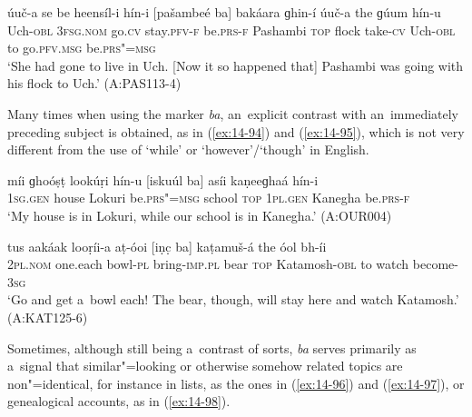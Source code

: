 \begin{exe}
\ex
\label{ex:14-93}
\gll úuč-a se  be heensíl-i  hín-i [pašambeé ba] bakáara ɡhin-í úuč-a the ɡúum hín-u \\
Uch-\textsc{obl} \textsc{3fsg.nom} go.\textsc{cv} stay.\textsc{pfv-f} be.\textsc{prs-f} Pashambi  \textsc{top} flock take-\textsc{cv} Uch-\textsc{obl} to go.\textsc{pfv.msg} be.\textsc{prs"=msg} \\
\glt `She had gone to live in Uch. [Now it so happened that] Pashambi was going with his flock to Uch.' (A:PAS113-4)
\end{exe}

Many times when using the marker \textit{ba}, an~explicit contrast with an~immediately preceding subject is obtained, as in (\ref{ex:14-94}) and (\ref{ex:14-95}), which is not very different from the use of `while' or `however'/`though' in English.

\begin{exe}
\ex
\label{ex:14-94}
\gll míi ɡhoóṣṭ lookúṛi hín-u [iskuúl ba] asíi  kaṇeeɡhaá hín-i \\
\textsc{1sg.gen} house Lokuri be.\textsc{prs"=msg} school \textsc{top} \textsc{1pl.gen} Kanegha be.\textsc{prs-f}\\
\glt `My house is in Lokuri, while our school is in Kanegha.' (A:OUR004)

\ex
\label{ex:14-95}
\gll tus aakáak looṛíi-a aṭ-óoi [iṇc̣ ba]  kaṭamuš-á the óol bh-íi \\
\textsc{2pl.nom} one.each bowl-\textsc{pl} bring-\textsc{imp.pl} bear \textsc{top} Katamosh-\textsc{obl} to watch become-\textsc{3sg } \\
\glt `Go and get a~bowl each! The bear, though, will stay here and watch Katamosh.' (A:KAT125-6)
\end{exe}

Sometimes, although still being a~contrast of sorts, \textit{ba} serves primarily as a~signal that similar"=looking or otherwise somehow related topics are non"=identical, for instance in lists, as the ones in (\ref{ex:14-96}) and (\ref{ex:14-97}), or genealogical accounts, as in (\ref{ex:14-98}). 

